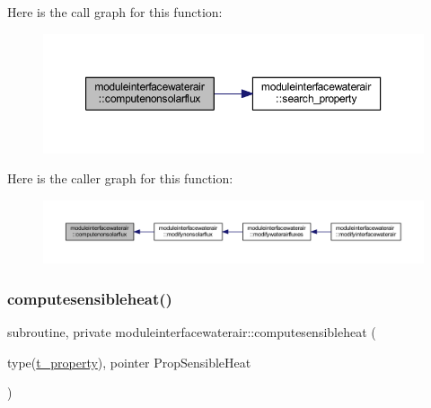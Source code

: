 Here is the call graph for this function\+:\nopagebreak
\begin{figure}[H]
\begin{center}
\leavevmode
\includegraphics[width=350pt]{namespacemoduleinterfacewaterair_a440fa94544c221014817ea4b5bea703a_cgraph}
\end{center}
\end{figure}
Here is the caller graph for this function\+:\nopagebreak
\begin{figure}[H]
\begin{center}
\leavevmode
\includegraphics[width=350pt]{namespacemoduleinterfacewaterair_a440fa94544c221014817ea4b5bea703a_icgraph}
\end{center}
\end{figure}
\mbox{\label{namespacemoduleinterfacewaterair_abe46b3644f7d36d7d60cc3a86eb0de5f}} 
\subsubsection{\texorpdfstring{computesensibleheat()}{computesensibleheat()}}
{\footnotesize\ttfamily subroutine, private moduleinterfacewaterair\+::computesensibleheat (\begin{DoxyParamCaption}\item[{type(\mbox{\hyperlink{structmoduleinterfacewaterair_1_1t__property}{t\+\_\+property}}), pointer}]{Prop\+Sensible\+Heat }\end{DoxyParamCaption})\hspace{0.3cm}{\ttfamily [private]}}

